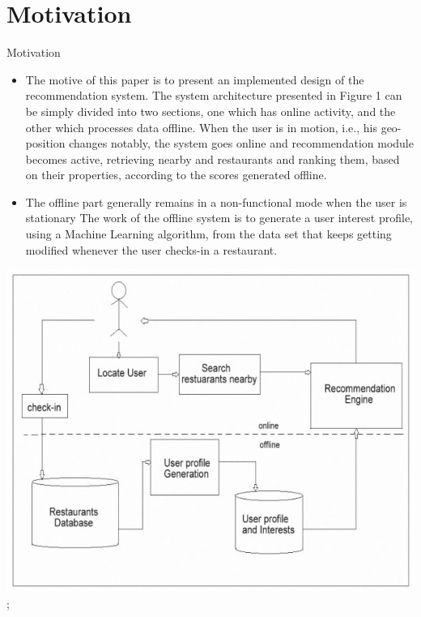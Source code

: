 \documentclass{if-beamer}
\begin{document}
\section{Motivation}
\begin{frame}{Motivation}
	\begin{itemize}
		\item The motive of this paper is to present an implemented 
		design of the recommendation system. The system 
		architecture presented in Figure 1 can be simply divided into 
		two sections, one which has online activity, and the other 
		which processes data offline. When the user is in motion, 
		i.e., his geo-position changes notably, the system goes online 
		and recommendation module becomes active, retrieving 
		nearby and restaurants and ranking them, based on their 
		properties, according to the scores generated offline.
		\item  The offline part generally remains in a non-functional mode 
		when the user is stationary The work of the offline system is 
		to generate a user interest profile, using a Machine Learning 
		algorithm, from the data set that keeps getting modified 
		whenever the user checks-in a restaurant. 
		
	\end{itemize}
	\begin{center}
		\includegraphics[scale=0.4]{Screenshot 2023-05-09 102947.jpg};
	\end{center}
\end{frame}
\end{document}
